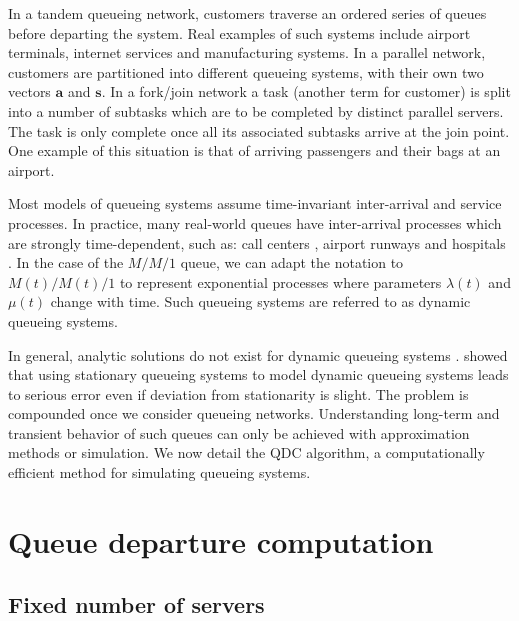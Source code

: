\documentclass[article]{jss}
\begin{document}
In a tandem queueing network, customers traverse an ordered series of
queues before departing the system. Real examples of such systems
include airport terminals, internet services and manufacturing
systems. In a parallel network, customers are partitioned into
different queueing systems, with their own two vectors $\mathbf{a}$ and $\mathbf{s}$.
In a fork/join network a task (another term for customer) is split into
a number of subtasks which are to be completed by distinct parallel
servers. The task is only complete once all its associated subtasks arrive
at the join point. One example of this situation is that of arriving passengers
and their bags at an airport.

Most models of queueing systems assume time-invariant inter-arrival
and service processes. In practice, many real-world queues have
inter-arrival processes which are strongly time-dependent, such as:
call centers \citep{weinberg2007bayesian, brown2005statistical},
airport runways \citep{koopman1972air} and hospitals
\citep{brahimi_queueing_1991}. In the case of the $M/M/1$ queue, we
can adapt the notation to $M(t)/M(t)/1$ to represent exponential
processes where parameters $\lambda(t)$ and $\mu(t)$ change with
time. Such queueing systems are referred to as dynamic queueing
systems.

In general, analytic solutions do not exist for dynamic queueing
systems \citep{malone1995dynamic,
  worthington2009reflections}. \citet{green1991some} showed that using
stationary queueing systems to model dynamic queueing systems leads to
serious error even if deviation from stationarity is slight. The
problem is compounded once we consider queueing
networks. Understanding long-term and transient behavior of such
queues can only be achieved with approximation methods or
simulation. We now detail the QDC algorithm, a computationally
efficient method for simulating queueing systems.

\section{Queue departure computation} \label{sec:QDC}

\subsection{Fixed number of servers}
\end{document}
